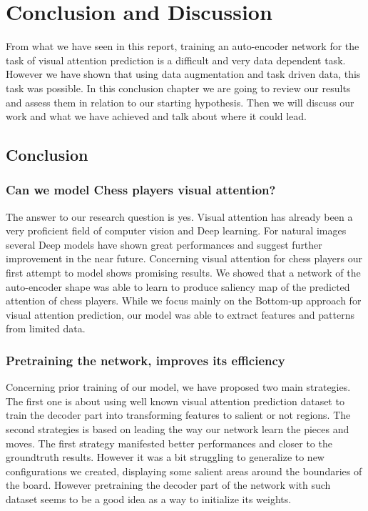 \chapter{Conclusion and Discussion}

From what we have seen in this report, training an auto-encoder network for the task of visual attention prediction is a difficult and very data dependent task. However we have shown that using data augmentation and task driven data, this task was possible. In this conclusion chapter we are going to review our results and assess them in relation to our starting hypothesis. Then we will discuss our work and what we have achieved and talk about where it could lead.
\section{Conclusion}
\subsection{Can we model Chess players visual attention?}

The answer to our research question is yes. Visual attention has already been a very proficient field of computer vision and Deep learning. For natural images several Deep models have shown great performances and suggest further improvement in the near future. Concerning visual attention for chess players our first attempt to model shows promising results. We showed that a network of the auto-encoder shape was able to learn to produce saliency map of the predicted attention of chess players. While we focus mainly on the Bottom-up approach for visual attention prediction, our model was able to extract features and patterns from limited data.


\subsection{Pretraining the network, improves its efficiency}

Concerning prior training of our model, we have proposed two main strategies. The first one is about using well known visual attention prediction dataset to train the decoder part into transforming features to salient or not regions. The second strategies is based on leading the way our network learn the pieces and moves. The first strategy manifested better performances and closer to the groundtruth results. However it was a bit struggling to generalize to new configurations we created, displaying some salient areas around the boundaries of the board.
However pretraining the decoder part of the network with such dataset seems to be a good idea as a way to initialize its weights.
